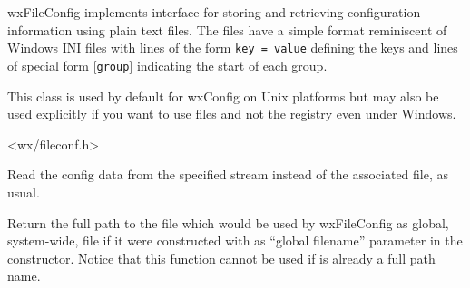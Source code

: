 
\section{}\label{wxfileconfig}

wxFileConfig implements  interface for
storing and retrieving configuration information using plain text files. The
files have a simple format reminiscent of Windows INI files with lines of the
form \texttt{key = value} defining the keys and lines of special form
\texttt{$[$group$]$} indicating the start of each group.

This class is used by default for wxConfig on Unix platforms but may also be
used explicitly if you want to use files and not the registry even under
Windows.




<wx/fileconf.h>





\label{wxfileconfigctor}


Read the config data from the specified stream instead of the associated file,
as usual.




\label{wxfilenamegetglobalfile}


Return the full path to the file which would be used by wxFileConfig as global,
system-wide, file if it were constructed with  as ``global
filename'' parameter in the constructor. Notice that this function cannot be
used if  is already a full path name.


